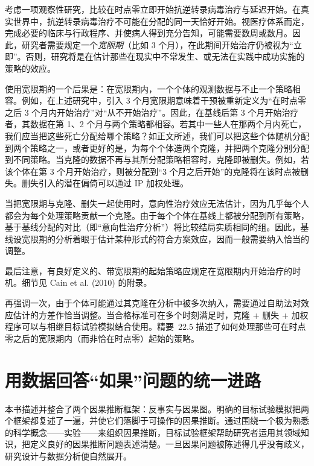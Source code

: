 \begin{finepoint}[宽限期]
考虑一项观察性研究，比较在时点零立即开始抗逆转录病毒治疗与延迟开始。在真实世界中，抗逆转录病毒治疗不可能在分配的同一天恰好开始。视医疗体系而定，完成必要的临床与行政程序、并使病人得到充分告知，可能需要数周或数月。因此，研究者需要规定一个\emph{宽限期}（比如 3 个月），在此期间开始治疗仍被视为“立即”。否则，研究将是在估计那些在现实中不常发生、或无法在实践中成功实施的策略的效应。

使用宽限期的一个后果是：在宽限期内，一个个体的观测数据与不止一个策略相容。例如，在上述研究中，引入 3 个月宽限期意味着干预被重新定义为“在时点零之后 3 个月内开始治疗”对“从不开始治疗”。因此，在基线后第 3 个月开始治疗者，其数据在第 1、2 个月与两个策略都相容。若其中一些人在那两个月内死亡，我们应当把这些死亡分配给哪个策略？如正文所述，我们可以把这些个体随机分配到两个策略之一，或者更好的是，为每个个体造两个克隆，并把两个克隆分别分配到不同策略。当克隆的数据不再与其所分配策略相容时，克隆即被删失。例如，若该个体在第 3 个月开始治疗，则被分配到“3 个月之后开始”的克隆将在该时点被删失。删失引入的潜在偏倚可以通过 IP 加权处理。

当把宽限期与克隆、删失一起使用时，意向性治疗效应无法估计，因为几乎每个人都会为每个处理策略贡献一个克隆。由于每个个体在基线上都被分配到所有策略，基于基线分配的对比（即“意向性治疗分析”）将比较结局实质相同的组。因此，基线设宽限期的分析着眼于估计某种形式的符合方案效应，因而一般需要纳入恰当的调整。

最后注意，有良好定义的、带宽限期的起始策略应规定在宽限期内开始治疗的时机。细节见 Cain et al. (2010) 的附录。
\end{finepoint}

再强调一次，由于个体可能通过其克隆在分析中被多次纳入，需要通过自助法对效应估计的方差作恰当调整。当合格标准可在多个时刻满足时，克隆 + 删失 + 加权程序可以与相继目标试验模拟结合使用。精要~22.5 描述了如何处理那些可在时点零之后的宽限期内（而非恰在时点零）起始的策略。

\section{用数据回答“如果”问题的统一进路}

本书描述并整合了两个因果推断框架：反事实与因果图。明确的目标试验模拟把两个框架都复述了一遍，并使它们落脚于可操作的因果推断。通过围绕一个极为熟悉的科学概念——实验——来组织因果推断，目标试验框架帮助研究者运用其领域知识，把定义良好的因果推断问题表述清楚。一旦因果问题被陈述得几乎没有歧义，研究设计与数据分析便自然展开。


